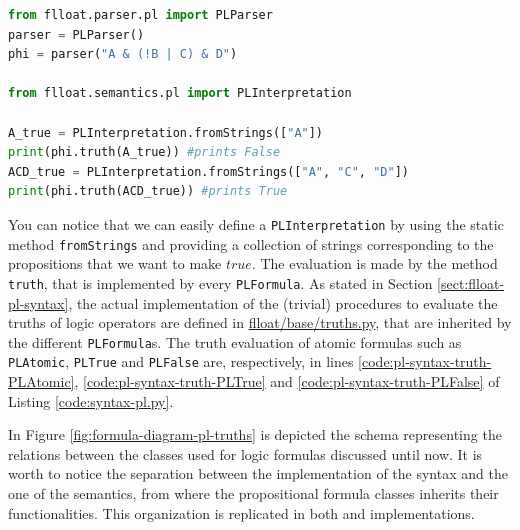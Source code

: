 \begin{lstlisting}[language=Python, style=Python, escapechar = £, label={code:pl-semantics-example}, caption={An example for \PL formula truth evaluation}]
from flloat.parser.pl import PLParser
parser = PLParser()
phi = parser("A & (!B | C) & D")

from flloat.semantics.pl import PLInterpretation

A_true = PLInterpretation.fromStrings(["A"])
print(phi.truth(A_true)) #prints False
ACD_true = PLInterpretation.fromStrings(["A", "C", "D"])
print(phi.truth(ACD_true)) #prints True
\end{lstlisting}

You can notice that we can easily define a \texttt{PLInterpretation} by using the static method \texttt{fromStrings} and providing a collection of strings corresponding to the propositions that we want to make $true$. The evaluation is made by the method \texttt{truth}, that is implemented by every \texttt{PLFormula}. As stated in Section \ref{sect:flloat-pl-syntax}, the actual implementation of the (trivial) procedures to evaluate the truths of logic operators are defined in \href{https://github.com/MarcoFavorito/flloat/blob/0.1.4/flloat/base/truths.py}{flloat/base/truths.py}, that are inherited by the different \texttt{PLFormula}s. The truth evaluation of atomic formulas such as \texttt{PLAtomic}, \texttt{PLTrue} and \texttt{PLFalse} are, respectively, in lines \ref{code:pl-syntax-truth-PLAtomic}, \ref{code:pl-syntax-truth-PLTrue} and \ref{code:pl-syntax-truth-PLFalse} of Listing \ref{code:syntax-pl.py}.

In Figure \ref{fig:formula-diagram-pl-truths} is depicted the schema representing the relations between the classes used for logic formulas discussed until now. It is worth to notice the separation between the implementation of the syntax and the one of the semantics, from where the propositional formula classes inherits their functionalities. This organization is replicated in both \LTLf and \LDLf implementations.

